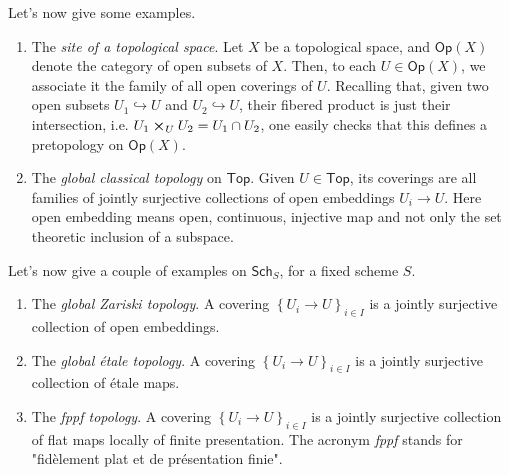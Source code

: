 \documentclass[../Main]{subfiles}
\begin{document}
\noindent
Let's now give some examples.
\begin{ex}\leavevmode\vspace{-.2\baselineskip}
\begin{enumerate}
	\item The {\em site of a topological space}.
		Let $X$ be a topological space, and $\mathsf{Op}(X)$ denote the category of
		open subsets of $X$.
		Then, to each $U \in \mathsf{Op}(X)$, we associate it the family of all
		open coverings of $U$.
		Recalling that, given two open subsets
		$U_1 \hookrightarrow  U$ and $U_2 \hookrightarrow  U$, 
		their fibered product is just their intersection, i.e. 
		$U_1 \cross_{ U } U_2 = U_1 \cap U_2$,
		one easily checks that this defines a pretopology on $\mathsf{Op}(X)$.


	\item The {\em global classical topology} on $\mathsf{Top}$.
		Given $U \in \mathsf{Top}$, its coverings are all families of jointly surjective
		collections of open embeddings $U_i \to U$.
		Here open embedding means open, continuous, injective map and not
		only the set theoretic inclusion of a subspace.



\end{enumerate}
Let's now give a couple of examples on $\mathsf{Sch}_{ S }$, for a fixed scheme $S$.
\begin{enumerate}[resume]
	\item The {\em global Zariski topology}.
		A covering $\left\{ U_{ i } \to U \right\}_{ i \in I }$ is a 
		jointly surjective collection of 
		open embeddings.
		

	\item The {\em global étale topology}.
		A covering $\left\{ U_{ i } \to U \right\}_{ i \in I }$ is a 
		jointly surjective collection of 
		étale maps.

	\item The {\em fppf topology}.
		A covering $\left\{ U_{ i } \to U \right\}_{ i \in I }$ is a 
		jointly surjective collection of 
		flat maps locally of finite presentation.
		The acronym {\em fppf} stands for 
		"fidèlement plat et de présentation finie".
\end{enumerate}
\end{ex}
\end{document}
